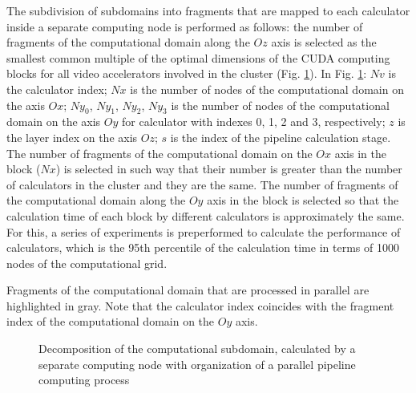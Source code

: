 \documentclass{svproc}
\begin{document}
The subdivision of subdomains into fragments that are mapped to each calculator inside a separate computing node is performed as follows: the number of fragments of the computational domain along the $Oz$ axis is selected as the smallest common multiple of the optimal dimensions of the CUDA computing blocks for all video accelerators involved in the cluster (Fig. \ref{fig2}).
In Fig. \ref{fig2}: $Nv$ is the calculator index; $Nx$ is the number of nodes of the computational domain on the axis $Ox$; $Ny_0$, $Ny_1$, $Ny_2$, $Ny_3$ is the number of nodes of the computational domain on the axis $Oy$ for calculator with indexes 0, 1, 2 and 3, respectively; $z$ is the layer index on the axis $Oz$; $s$ is the index of the pipeline calculation stage.
The number of fragments of the computational domain on the $Ox$ axis in the block ($Nx$) is selected in such way that their number is greater than the number of calculators in the cluster and they are the same. 
The number of fragments of the computational domain along the $Oy$ axis in the block is selected so that the calculation time of each block by different calculators is approximately the same. For this, a series of experiments is preperformed to calculate the performance of calculators, which is the 95th percentile of the calculation time in terms of 1000 nodes of the computational grid.

Fragments of the computational domain that are processed in parallel are highlighted in gray. Note that the calculator index coincides with the fragment index of the computational domain on the $Oy$ axis.

\begin{figure}[h!]
	\caption{Decomposition of the computational subdomain, calculated by a separate computing node with organization of a parallel pipeline computing process} \label{fig2}
\end{figure}
\end{document}
